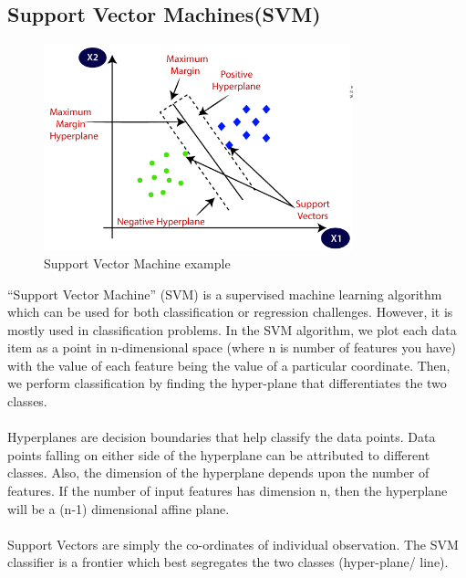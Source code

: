 \subsection*{Support Vector Machines(SVM)}
\begin{figure}[!ht]
	\centering
	\includegraphics[width=0.8\textwidth]{images/svm.png}
	\caption{Support Vector Machine example}
	\centering
	\label{label:svm}
\end{figure}
“Support Vector Machine” (SVM) is a supervised machine learning algorithm which can be used for both classification or regression challenges. However,  it is mostly used in classification problems. In the SVM algorithm, we plot each data item as a point in n{-}dimensional space (where n is number of features you have) with the value of each feature being the value of a particular coordinate. Then, we perform classification by finding the hyper-plane that differentiates the two classes.\\
\\
Hyperplanes are decision boundaries that help classify the data points. Data points falling on either side of the hyperplane can be attributed to different classes. Also, the dimension of the hyperplane depends upon the number of features. If the number of input features has dimension n, then the hyperplane will be a (n-1) dimensional affine plane.\\
\\
Support Vectors are simply the co-ordinates of individual observation. The SVM classifier is a frontier which best segregates the two classes (hyper-plane/ line).